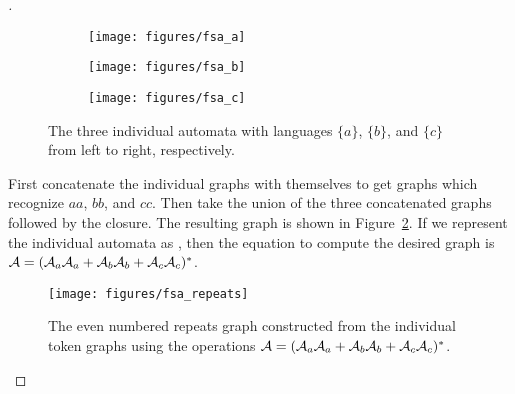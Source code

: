 \begin{proof}[\unskip\nopunct]

\begin{figure}
    \centering
    \begin{subfigure}[b]{0.32\textwidth}
        \centering
        \texttt{[image: figures/fsa\_a]}
    \end{subfigure}
    \begin{subfigure}[b]{0.32\textwidth}
        \centering
        \texttt{[image: figures/fsa\_b]}
    \end{subfigure}
    \begin{subfigure}[b]{0.32\textwidth}
        \centering
        \texttt{[image: figures/fsa\_c]}
    \end{subfigure}
    \caption{The three individual automata with languages $\{a\}$, $\{b\}$, and
    $\{c\}$ from left to right, respectively.}
    \label{fig:fsa_tokens}
\end{figure}

First concatenate the individual graphs with themselves to get graphs which
recognize $aa$, $bb$, and $cc$. Then take the union of the three
concatenated graphs followed by the closure. The resulting graph is shown
in Figure~\ref{fig:fsa_repeats}. If we represent the individual automata as
, then the equation to compute the desired graph is $\mathcal{A} = (\mathcal{A}_a\mathcal{A}_a +
\mathcal{A}_b\mathcal{A}_b + \mathcal{A}_c\mathcal{A}_c)^*$.

\begin{figure}
    \centering
    \texttt{[image: figures/fsa\_repeats]}
    \caption{The even numbered repeats graph constructed from the individual
    token graphs using the operations $\mathcal{A} = (\mathcal{A}_a\mathcal{A}_a + \mathcal{A}_b\mathcal{A}_b +
    \mathcal{A}_c\mathcal{A}_c)^*$.}
    \label{fig:fsa_repeats}
\end{figure}

\end{proof}

